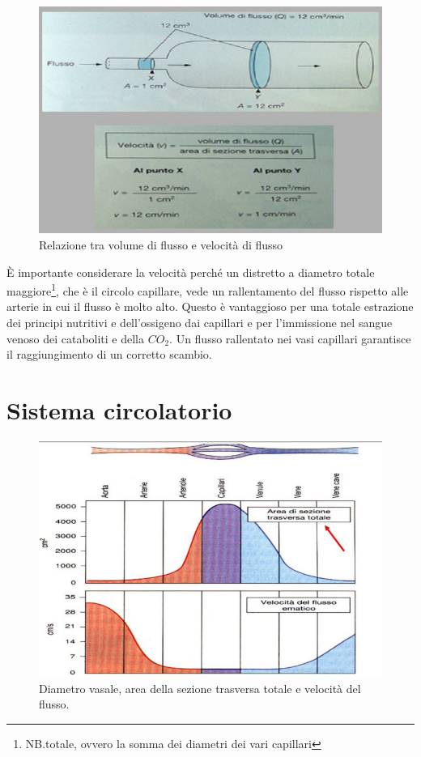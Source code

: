 \documentclass[a4paper,12pt]{article}
\begin{document}
\begin{figure}[H]
\centering
\includegraphics[scale=0.4]{immagine/velocita.jpg}
\caption{Relazione tra volume di flusso e velocità di flusso}
\end{figure}

È importante considerare la velocità perché un distretto a diametro totale maggiore\footnote{NB.totale, ovvero la somma dei diametri dei vari capillari}, che è il circolo capillare, vede un rallentamento del flusso rispetto alle arterie in cui il flusso è molto alto. Questo è vantaggioso per una totale estrazione dei principi nutritivi e dell'ossigeno dai capillari e per l'immissione nel sangue venoso dei cataboliti e della $CO_{2}$. Un flusso rallentato nei vasi capillari garantisce il raggiungimento di un corretto scambio.
\section{Sistema circolatorio}
\begin{figure}[H]
\centering
\includegraphics[scale=0.4]{immagine/diametro.jpg}
\caption{Diametro vasale, area della sezione trasversa totale e velocità del flusso.}
\end{figure}
\end{document}
